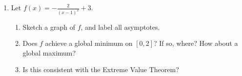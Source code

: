 \documentclass{article}
\begin{document}
\begin{enumerate}
  \begin{problem}[\newpage]
    In \ref{fall2023-workshop6-2}, you found the discontinuities of $f(x) = \dfrac{x^3 + x^2 - 12 x}{x^2 - 16}$. Now, use limits to classify each discontinuity (as a removable discontinuity, jump discontinuity, or vertical asymptote).
  \end{problem}

\item  Let $\displaystyle f(x) = - \frac{2}{(x - 1)^2} + 3$.

  \begin{enumerate}
  \item
    \begin{problem}[\stretch{1.5}]
      Sketch a graph of $f$, and label all asymptotes. 
    \end{problem}

  \item
    \begin{problem}[\vfill]
      Does $f$ achieve a global minimum on $[0, 2]$? If so, where? How about a global maximum? 
    \end{problem}

  \item
    \begin{problem}[\nstretch{0.25}]
      Is this consistent with the Extreme Value Theorem?
    \end{problem}

  \end{enumerate}

\end{enumerate}
\end{document}
